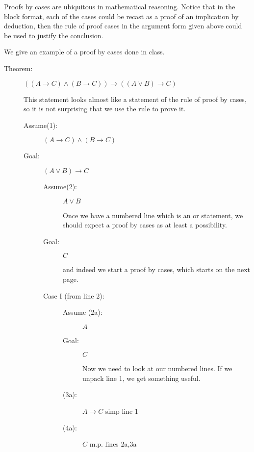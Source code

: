 \documentclass[12pt]{article}
\begin{document}
Proofs by cases are ubiquitous in mathematical reasoning.  Notice that in the block format, each of the cases could be recast as a proof of
an implication by deduction, then the rule of proof cases in the argument form given above could be used to justify the conclusion.

We give an example of a proof by cases done in class.

\begin{description}

\item[Theorem:]  $((A \rightarrow C) \wedge (B \rightarrow C)) \rightarrow ((A\vee B)\rightarrow C)$

This statement looks almost like a statement of the rule of proof by cases, so it is not surprising that we use the rule to prove it.

\begin{description}

\item[Assume(1):]  $(A \rightarrow C) \wedge (B \rightarrow C)$

\item[Goal:]  $(A\vee B) \rightarrow C$

\begin{description}

\item[Assume(2):]  $A \vee B$

Once we have a numbered line which is an or statement, we should expect a proof by cases as at least a possibility.

\item[Goal:]  $C$

and indeed we start a proof by cases, which starts on the next page.

\newpage

\item[Case I (from line 2):]

\begin{description}

\item[Assume (2a):]  $A$

\item[Goal:]  $C$

Now we need to look at our numbered lines.  If we unpack line 1, we get something useful.

\item[(3a):]  $A \rightarrow C$ simp line 1

\item[(4a):]  $C$ m.p. lines 2a,3a


\end{description}
\end{description}
\end{description}
\end{description}
\end{document}
